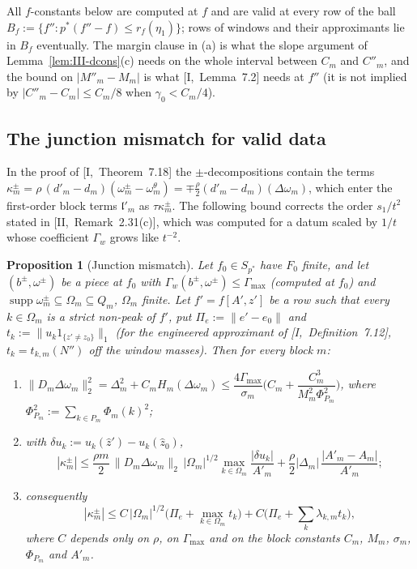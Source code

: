 \documentclass[10pt]{amsart}
\newtheorem{proposition}[theorem]{Proposition}
\theoremstyle{definition}
\theoremstyle{remark}
\newcommand{\supp}{\operatorname{supp}}
\newcommand{\zh}{\hat z}
\newcommand{\lin}{\mathfrak l}
\begin{document}
All $f$-constants below are computed at $f$ and are valid at every row of the
ball $B_f:=\{f'':p^*(f''-f)\le r_f(\eta_1)\}$; rows of windows and their
approximants lie in $B_f$ eventually.  The margin clause in (a) is what the
slope argument of Lemma~\ref{lem:III-dcons}(c) needs on the whole interval
between $C_m$ and $C''_m$, and the bound on $|M''_m-M_m|$ is what
[I,~Lemma~7.2] needs at $f''$ (it is not implied by $|C''_m-C_m|\le C_m/8$ when
$\gamma_0<C_m/4$).

\subsection{The junction mismatch for valid data}\label{subsec:III-J}

In the proof of [I,~Theorem~7.18] the $\pm$-decompositions contain the terms
$\kappa^\pm_m=\rho\,(d'_m-d_m)(\omega^\pm_m-\omega^\theta_m)=\mp\frac\rho2
(d'_m-d_m)(\Delta\omega_m)$, which enter the first-order block terms
$\lin'_m$ as $\tau\kappa^\pm_m$.  The following bound corrects the order
$s_1/t^2$ stated in [II,~Remark~2.31(c)], which was computed for a datum
scaled by $1/t$ whose coefficient $\Gamma_w$ grows like $t^{-2}$.

\begin{proposition}[Junction mismatch]\label{prop:III-J}
Let $f_0\in S_{p^*}$ have $F_0$ finite, and let $(b^\pm,\omega^\pm)$ be a piece
at $f_0$ with $\Gamma_w(b^\pm,\omega^\pm)\le\Gamma_{\max}$ \textup{(}computed at
$f_0$\textup{)} and $\supp\omega^\pm_m\subseteq\Omega_m\subseteq Q_m$, $\Omega_m$
finite.  Let $f'=f[A',z']$ be a row such that every $k\in\Omega_m$ is a strict
non-peak of $f'$, put $\Pi_e:=\|e'-e_0\|$ and
$t_k:=\|u_k1_{\{z'\ne z_0\}}\|_1$ \textup{(}for the engineered approximant of
[I,~Definition~7.12], $t_k=t_{k,m}(N'')$ off the window masses\textup{)}.  Then
for every block $m$:
\begin{enumerate}
\item[(a)] $\|D_m\Delta\omega_m\|_2^2=\Delta_m^2+C_mH_m(\Delta\omega_m)\le
\dfrac{4\Gamma_{\max}}{\sigma_m}\Big(C_m+\dfrac{C_m^3}{M_m^2\Phi_{P_m}^2}\Big)$,
where $\Phi_{P_m}^2:=\sum_{k\in P_m}\Phi_m(k)^2$;
\item[(b)] with $\delta u_k:=u_k(\zh')-u_k(\zh_0)$,
\[
 |\kappa^\pm_m|\le\frac{\rho m}2\,\|D_m\Delta\omega_m\|_2\,|\Omega_m|^{1/2}
 \max_{k\in\Omega_m}\frac{|\delta u_k|}{A'_m}+\frac\rho2|\Delta_m|\,
 \frac{|A'_m-A_m|}{A'_m};
\]
\item[(c)] consequently
\[
 |\kappa^\pm_m|\le C\,|\Omega_m|^{1/2}\big(\Pi_e+
\max_{k\in\Omega_m}t_k\big)+C\big(\Pi_e+\textstyle\sum_k\lambda_{k,m}t_k\big),
\]
where $C$ depends only on $\rho$, on $\Gamma_{\max}$ and on the block
constants $C_m$, $M_m$, $\sigma_m$, $\Phi_{P_m}$ and $A'_m$.
\end{enumerate}
\end{proposition}
\end{document}
